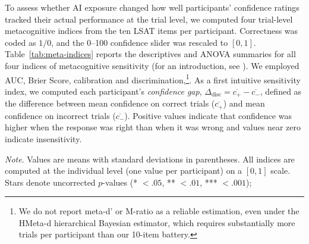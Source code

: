\documentclass[manuscript, anonymous=false,authorversion,review=false]{acmart}
\begin{document}
To assess whether AI exposure changed how well participants' confidence ratings tracked their actual performance at the trial level, we computed four trial-level metacognitive indices from the ten LSAT items per participant. Correctness was coded as $1/0$, and the 0--100 confidence slider was rescaled to $[0,1]$. Table~\ref{tab:meta-indices} reports the descriptives and ANOVA summaries for all four indices of metacognitive sensitivity (for an introduction, see \citet{rahnev2025comprehensive}). We employed AUC, Brier Score, calibration and discrimination,\footnote{We do not report meta-d' or M-ratio as a reliable estimation, even under the HMeta-d hierarchical Bayesian estimator, which requires substantially more trials per participant than our 10-item battery.}. 
As a first intuitive sensitivity index, we computed each participant's
\emph{confidence gap}, $\Delta_{\text{disc}} = \overline{c_{+}} - \overline{c_{-}}$, defined as the difference between mean confidence on correct trials ($\overline{c_{+}}$) and mean confidence on incorrect trials ($\overline{c_{-}}$). Positive values indicate that confidence was higher when the response was right than when it was wrong and values near zero indicate insensitivity. 

\begin{table}[H]
\centering
\caption{One-way ANOVAs with descriptives by condition for the four
metacognitive indices.}
\label{tab:meta-indices}

\raggedright \small \textit{Note}. Values are means with standard deviations in
parentheses. All indices are computed at the individual level (one
value per participant) on a $[0,1]$ scale. Stars denote uncorrected $p$-values (* $<.05$, ** $<.01$, *** $<.001$); 
\end{table}
\end{document}
